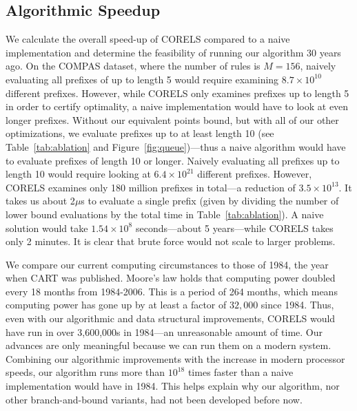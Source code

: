 \subsection{Algorithmic Speedup}
We calculate the overall speed-up of CORELS compared to a naive implementation and determine the feasibility of running
our algorithm 30 years ago.
%
On the COMPAS dataset, where the number of rules is $M = 156$, naively evaluating all prefixes of up to length 5 would
require examining $8.7 \times 10^{10}$ different prefixes.
%
However, while CORELS only examines prefixes up to length 5 in order to certify optimality, a naive implementation 
would have to look at even longer prefixes. 
%
Without our equivalent points bound, but with all of our other optimizations, we evaluate prefixes up to at least length 10 (see 
Table~\ref{tab:ablation} and Figure~\ref{fig:queue})---thus a naive algorithm would have to evaluate prefixes of length 10 or longer.
%
Naively evaluating all prefixes up to length 10 would require looking at $6.4 \times 10^{21}$ different prefixes.
%
However, CORELS examines only 180 million prefixes in total---a reduction of $3.5 \times 10^{13}$.
%
It takes us about 2$\mu$s to evaluate a single prefix (given by dividing the number of lower bound evaluations by the total time
in Table~\ref{tab:ablation}).
%
A naive solution would take $1.54 \times 10^8$ seconds---about 5 years---while CORELS takes only 2 minutes.
%
It is clear that brute force would not scale to larger problems.
%

We compare our current computing circumstances to those of 1984, the year when CART was published.
%
Moore's law holds that computing power doubled every 18 months from 1984-2006.
%
This is a period of 264 months, which means computing power has gone up by at least a factor of $32,000$ since 1984.
%
Thus, even with our algorithmic and data structural improvements, CORELS would have run in over 3,600,000s in 1984---an unreasonable amount of time.
%
Our advances are only meaningful because we can run them on a modern system.
%
Combining our algorithmic improvements with the increase in modern processor speeds, our algorithm runs more than $10^{18}$ times faster than a naive implementation would have in 1984.
%
This helps explain why our algorithm, nor other branch-and-bound variants, had not been developed before now.
